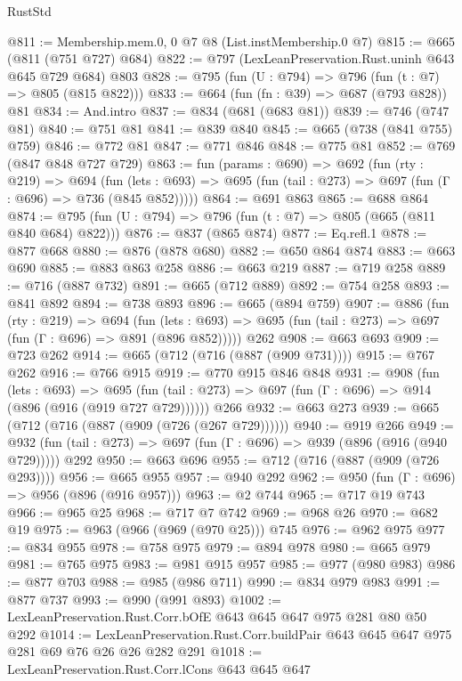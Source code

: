 \begin{lexlean}{RustStd}
\begin{coremodule}
{\begin{coremodule}
{{{{{{{@811 := Membership.mem.{0, 0} @7 @8 (List.instMembership.{0} @7)
@815 := @665 (@811 (@751 @727) @684)
@822 := @797 (LexLeanPreservation.Rust.uninh @643 @645 @729 @684) @803
@828 := @795 (fun (U : @794) => @796 (fun (t : @7) => @805 (@815 @822)))
@833 := @664 (fun (fn : @39) => @687 (@793 @828)) @81
@834 := And.intro
@837 := @834 (@681 (@683 @81))
@839 := @746 (@747 @81)
@840 := @751 @81
@841 := @839 @840
@845 := @665 (@738 (@841 @755) @759)
@846 := @772 @81
@847 := @771 @846
@848 := @775 @81
@852 := @769 (@847 @848 @727 @729)
@863 := fun (params : @690) =>
  @692
    (fun (rty : @219) =>
    @694
      (fun (lets : @693) => @695 (fun (tail : @273) => @697 (fun (Γ : @696) => @736 (@845 @852)))))
@864 := @691 @863
@865 := @688 @864
@874 := @795 (fun (U : @794) => @796 (fun (t : @7) => @805 (@665 (@811 @840 @684) @822)))
@876 := @837 (@865 @874)
@877 := Eq.refl.{1}
@878 := @877 @668
@880 := @876 (@878 @680)
@882 := @650 @864 @874
@883 := @663 @690
@885 := @883 @863 @258
@886 := @663 @219
@887 := @719 @258
@889 := @716 (@887 @732)
@891 := @665 (@712 @889)
@892 := @754 @258
@893 := @841 @892
@894 := @738 @893
@896 := @665 (@894 @759)
@907 := @886
    (fun (rty : @219) =>
    @694
      (fun (lets : @693) => @695 (fun (tail : @273) => @697 (fun (Γ : @696) => @891 (@896 @852)))))
    @262
@908 := @663 @693
@909 := @723 @262
@914 := @665 (@712 (@716 (@887 (@909 @731))))
@915 := @767 @262
@916 := @766 @915
@919 := @770 @915 @846 @848
@931 := @908
    (fun (lets : @693) =>
    @695 (fun (tail : @273) => @697 (fun (Γ : @696) => @914 (@896 (@916 (@919 @727 @729))))))
    @266
@932 := @663 @273
@939 := @665 (@712 (@716 (@887 (@909 (@726 (@267 @729))))))
@940 := @919 @266
@949 := @932 (fun (tail : @273) => @697 (fun (Γ : @696) => @939 (@896 (@916 (@940 @729))))) @292
@950 := @663 @696
@955 := @712 (@716 (@887 (@909 (@726 @293))))
@956 := @665 @955
@957 := @940 @292
@962 := @950 (fun (Γ : @696) => @956 (@896 (@916 @957)))
@963 := @2 @744
@965 := @717 @19 @743
@966 := @965 @25
@968 := @717 @7 @742
@969 := @968 @26
@970 := @682 @19
@975 := @963 (@966 (@969 (@970 @25))) @745
@976 := @962 @975
@977 := @834 @955
@978 := @758 @975
@979 := @894 @978
@980 := @665 @979
@981 := @765 @975
@983 := @981 @915 @957
@985 := @977 (@980 @983)
@986 := @877 @703
@988 := @985 (@986 @711)
@990 := @834 @979 @983
@991 := @877 @737
@993 := @990 (@991 @893)
@1002 := LexLeanPreservation.Rust.Corr.bOfE @643 @645 @647 @975 @281 @80 @50 @292
@1014 := LexLeanPreservation.Rust.Corr.buildPair @643 @645 @647 @975 @281 @69 @76 @26 @26 @282 @291
@1018 := LexLeanPreservation.Rust.Corr.lCons @643 @645 @647
}}}}}}}
\end{coremodule}}
\end{coremodule}
\end{lexlean}
